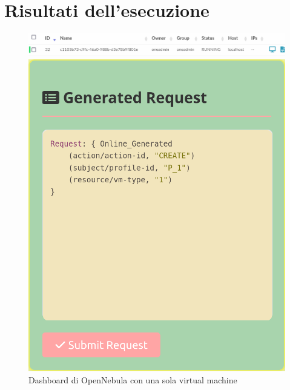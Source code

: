 \section{Risultati dell'esecuzione}
\begin{figure}[H]
    \centering
    \begin{minipage}{1\textwidth}
        \centering
        \includegraphics[width=\textwidth]{tesi_screenshot/OpenNebula_firstVM.png}
        \caption{Dashboard di OpenNebula con una sola virtual machine}
        \label{fig:dashboardFirstVM}
    \end{minipage}
    \begin{minipage}{0.49\textwidth}
        \centering
        \includegraphics[width=\textwidth]{tesi_screenshot/P1Create_1.png}
    \end{minipage}
    \begin{minipage}{0.49\textwidth}
        \centering

\end{minipage}
\end{figure}
